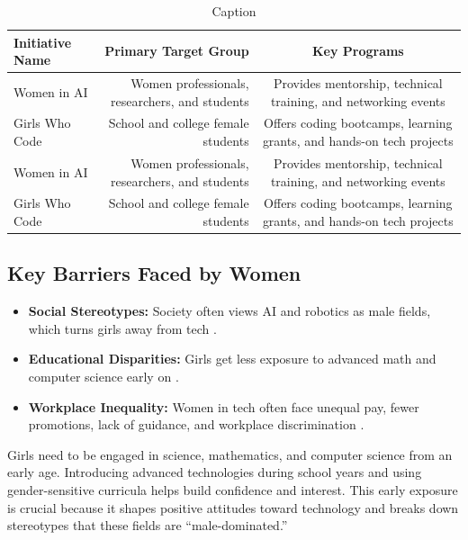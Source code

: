 \documentclass{article}
\begin{document}
\begin{table}
\centering
    \begin{tabular}{l|r|c}
            \hline\textbf{Initiative Name} &\textbf{Primary Target Group} & \textbf{Key Programs}\\\hline
       Women in AI & Women professionals, researchers, and students & Provides mentorship, technical training, and networking events \\\hline
        Girls Who Code & School and college female students & Offers coding bootcamps, learning grants, and hands-on tech projects \\\hline
         Women in AI & Women professionals, researchers, and students & Provides mentorship, technical training, and networking events \\
        Girls Who Code & School and college female students & Offers coding bootcamps, learning grants, and hands-on tech projects \\\hline
        
    \end{tabular}
    \caption{Caption}
    \label{tab:placeholder}
\end{table}

\subsection{Key Barriers Faced by Women}
\begin{itemize}
    \item \textbf{Social Stereotypes:} Society often views AI and robotics as male fields, which turns girls away from tech \cite{haydarova2025}.
    \item \textbf{Educational Disparities:} Girls get less exposure to advanced math and computer science early on \cite{haydarova2025}.
    \item \textbf{Workplace Inequality:} Women in tech often face unequal pay, fewer promotions, lack of guidance, and workplace discrimination \cite{haydarova2025}.
\end{itemize}

 Girls need to be engaged in science, mathematics, and computer science from an early age. Introducing advanced technologies during school years and using gender-sensitive curricula helps build confidence and interest. This early exposure is crucial because it shapes positive attitudes toward technology and breaks down stereotypes that these fields are “male-dominated.”
\end{document}
